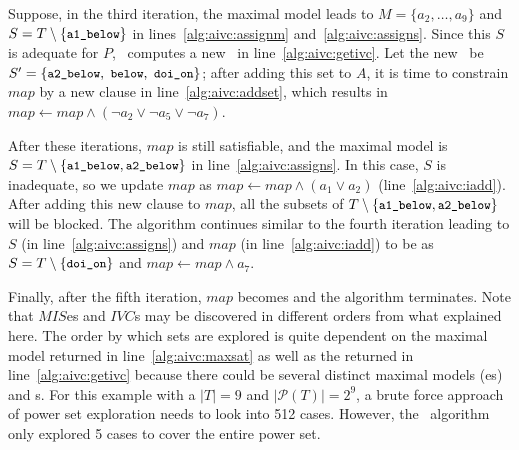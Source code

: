 Suppose, in the third iteration, the maximal model leads to $M = \{a_2, \ldots, a_9\}$ and
$S = T \setminus \{ {\small \texttt{a1\_below}}\} $ in lines~\ref{alg:aivc:assignm} and~\ref{alg:aivc:assigns}.
Since this $S$ is adequate for $P$, \getivc ~computes a new \mivc\ in line~\ref{alg:aivc:getivc}.
Let the new \mivc\ be $S' = \{ {\small \texttt{a2\_below},~\texttt{below}, ~\texttt{doi\_on}}\}$; after adding this set to $A$,
it is time to constrain $map$ by a new clause in line~\ref{alg:aivc:addset},
which results in $map \leftarrow map \wedge (\neg a_2 \vee \neg a_5 \vee \neg a_7)$.

After these iterations, $map$ is still satisfiable, and the maximal model is
 $S = T \setminus \{ { \small \texttt{a1\_below}}, { \small \texttt{a2\_below}}\}$ in line~\ref{alg:aivc:assigns}.
In this case, $S$ is inadequate, so we update $map$ as
$map \leftarrow map \wedge (a_1 \vee a_2)$ (line~\ref{alg:aivc:iadd}). After adding this new clause to $map$,
all the subsets of $T \setminus \{ { \small \texttt{a1\_below}}, {\small \texttt{a2\_below}}\}$
will be blocked. The algorithm continues similar to the fourth iteration leading to $S$ (in line~\ref{alg:aivc:assigns}) and $map$ (in line~\ref{alg:aivc:iadd}) to be as
 $S = T \setminus \{ {\small  \texttt{doi\_on}}\}$ and $map \leftarrow map \wedge a_7$.

Finally, after the fifth iteration, $map$ becomes \unsat and the algorithm terminates.
Note that $MIS$es and $IVC$s may be discovered in different orders from what explained here. The order by which sets are explored is
quite dependent on the maximal model returned in line~\ref{alg:aivc:maxsat} as well as the \mivc returned in line~\ref{alg:aivc:getivc} because there could be several distinct maximal models (\mis es) and \mivc s. For this example with a $|T| = 9$ and $|\mathcal{P}(T)| = 2^9$, a brute force approach of power set exploration needs to look into 512  cases. However, the \aivcalg ~algorithm only explored 5 cases to cover the entire power set. %



